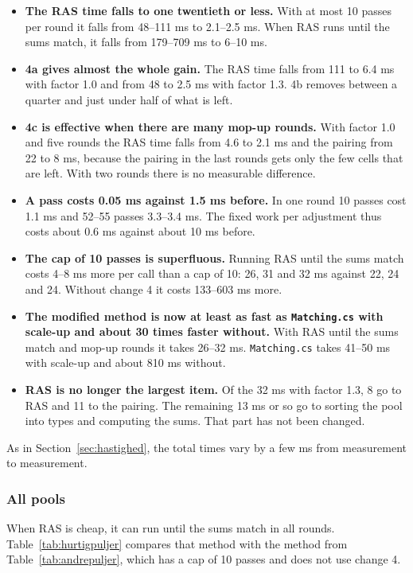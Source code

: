 \documentclass[12pt,a4paper]{article}
\newcommand{\kode}[1]{\texttt{#1}}
\begin{document}
\begin{itemize}
\item \textbf{The RAS time falls to one twentieth or less.} With at most 10 passes per round it
falls from 48--111 ms to 2.1--2.5 ms. When RAS runs until the sums match, it falls from 179--709 ms
to 6--10 ms.
\item \textbf{4a gives almost the whole gain.} The RAS time falls from 111 to 6.4 ms with factor
1.0 and from 48 to 2.5 ms with factor 1.3. 4b removes between a quarter and just under half of
what is left.
\item \textbf{4c is effective when there are many mop-up rounds.} With factor 1.0 and five rounds
the RAS time falls from 4.6 to 2.1 ms and the pairing from 22 to 8 ms, because the pairing in the
last rounds gets only the few cells that are left. With two rounds there is no measurable
difference.
\item \textbf{A pass costs 0.05 ms against 1.5 ms before.} In one round 10 passes cost 1.1 ms and
52--55 passes 3.3--3.4 ms. The fixed work per adjustment thus costs about 0.6 ms against about
10 ms before.
\item \textbf{The cap of 10 passes is superfluous.} Running RAS until the sums match costs 4--8 ms
more per call than a cap of 10: 26, 31 and 32 ms against 22, 24 and 24. Without change 4 it costs
133--603 ms more.
\item \textbf{The modified method is now at least as fast as \kode{Matching.cs} with scale-up and
about 30 times faster without.} With RAS until the sums match and mop-up rounds it takes 26--32 ms.
\kode{Matching.cs} takes 41--50 ms with scale-up and about 810 ms without.
\item \textbf{RAS is no longer the largest item.} Of the 32 ms with factor 1.3, 8 go to RAS and 11
to the pairing. The remaining 13 ms or so go to sorting the pool into types and computing the sums.
That part has not been changed.
\end{itemize}

As in Section~\ref{sec:hastighed}, the total times vary by a few ms from measurement to
measurement.

\subsubsection*{All pools}

When RAS is cheap, it can run until the sums match in all rounds. Table~\ref{tab:hurtigpuljer}
compares that method with the method from Table~\ref{tab:andrepuljer}, which has a cap of 10 passes
and does not use change 4.
\end{document}
